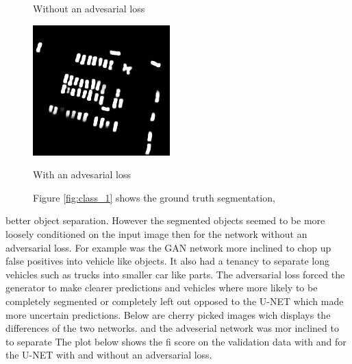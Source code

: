 \documentclass[a4paper,11pt]{article}
\begin{document}
\begin{figure}[H]
  \caption{Without an advesarial loss}\label{fig:class_1}
\endminipage\hfill
{}%
  \includegraphics[width=\linewidth]{gan_vs_class/gan_1}
  \caption{With an advesarial loss}\label{fig:label_2}
\endminipage

\caption{Figure \ref{fig:class_1} shows the ground truth segmentation, }
\end{figure}
better object separation. However the segmented objects seemed to be more loosely conditioned on the input image then for the network without an adversarial loss. For example was the GAN network more inclined to chop up false positives into vehicle like objects. It also had a tenancy to separate long vehicles such as trucks into smaller car like parts. The adversarial loss forced the generator to make clearer predictions and vehicles where more likely to be completely segmented or completely left out opposed to the U-NET which made more uncertain predictions. Below are cherry picked images wich displays the differences of the two networks. and the adveserial network was mor inclined to to separate The plot below shows the fi score on the validation data with and for the U-NET with and without an adversarial loss.
\end{document}
